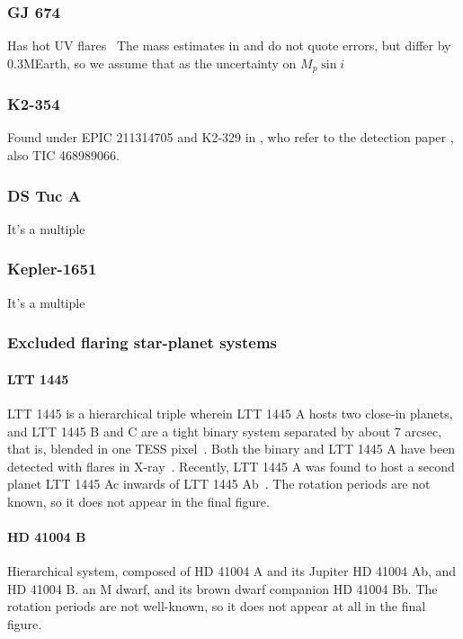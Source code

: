 \documentclass[twocolumn]{aastex631}
\begin{document}
\subsubsection{GJ 674}
Has hot UV flares~\cite{froning2019hot}
The mass estimates in \cite{bonfils2007harps} and \cite{boisse2011disentangling} do not quote errors, but differ by 0.3MEarth, so we assume that as the uncertainty on $M_p\sin i$

\subsubsection{K2-354}
Found under EPIC 211314705 and K2-329 in \cite{bouma2020cluster}, who refer to the detection paper \cite{pope2016transiting}, also TIC 468989066.

\subsubsection{DS Tuc A}
It's a multiple
\subsubsection{Kepler-1651}
It's a multiple


\subsubsection{Excluded flaring star-planet systems}
\paragraph{LTT 1445}
 LTT 1445 is a hierarchical triple wherein LTT 1445 A hosts two close-in planets, and LTT 1445 B and C are a tight binary system separated by about 7 arcsec, that is, blended in one TESS pixel~\citep{winters2019three}. Both the binary and LTT 1445 A have been detected with flares in X-ray~\citep{brown2022xray}. Recently, LTT 1445 A was found to host a second planet LTT 1445 Ac inwards of LTT 1445 Ab~\citep{lavie2022planetary}. The rotation periods are not known, so it does not appear in the final figure.

\paragraph{HD 41004 B}
Hierarchical system, composed of HD 41004 A and its Jupiter HD 41004 Ab, and HD 41004 B. an M dwarf, and its brown dwarf companion HD 41004 Bb. The rotation periods are not well-known, so it does not appear at all in the final figure.
\end{document}
